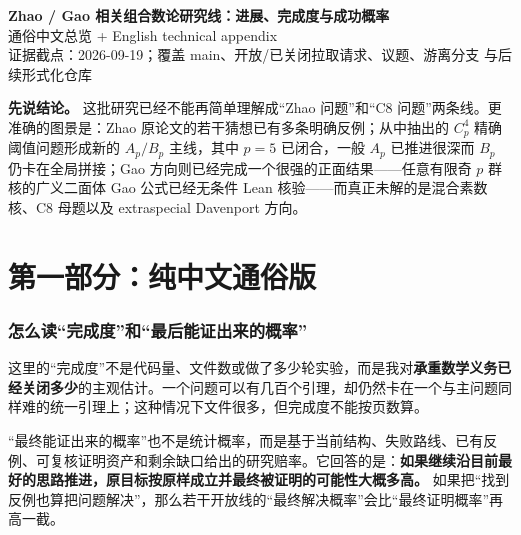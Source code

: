 \documentclass[11pt,a4paper]{ctexart}
\begin{document}
\begin{center}
{\LARGE\bfseries Zhao / Gao 相关组合数论研究线：进展、完成度与成功概率}\\[0.5em]
{\large 通俗中文总览 + English technical appendix}\\[0.8em]
{\small 证据截点：2026-09-19；覆盖 main、开放/已关闭拉取请求、议题、游离分支 与后续形式化仓库}
\end{center}

\vspace{0.5em}
\noindent\textbf{先说结论。} 这批研究已经不能再简单理解成“Zhao 问题”和“C8 问题”两条线。更准确的图景是：Zhao 原论文的若干猜想已有多条明确反例；从中抽出的 $C_p^4$ 精确阈值问题形成新的 $A_p/B_p$ 主线，其中 $p=5$ 已闭合，一般 $A_p$ 已推进很深而 $B_p$ 仍卡在全局拼接；Gao 方向则已经完成一个很强的正面结果——任意有限奇 $p$ 群核的广义二面体 Gao 公式已经无条件 Lean 核验——而真正未解的是混合素数核、C8 母题以及 extraspecial Davenport 方向。

\tableofcontents
\newpage

\part*{第一部分：纯中文通俗版}

\section{怎么读“完成度”和“最后能证出来的概率”}

这里的“完成度”不是代码量、文件数或做了多少轮实验，而是我对\textbf{承重数学义务已经关闭多少}的主观估计。一个问题可以有几百个引理，却仍然卡在一个与主问题同样难的统一引理上；这种情况下文件很多，但完成度不能按页数算。

“最终能证出来的概率”也不是统计概率，而是基于当前结构、失败路线、已有反例、可复核证明资产和剩余缺口给出的研究赔率。它回答的是：\textbf{如果继续沿目前最好的思路推进，原目标按原样成立并最终被证明的可能性大概多高。} 如果把“找到反例也算把问题解决”，那么若干开放线的“最终解决概率”会比“最终证明概率”再高一截。
\end{document}
